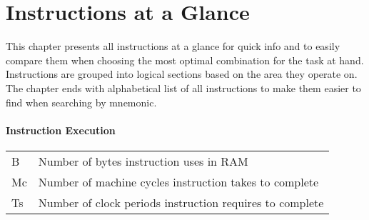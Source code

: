 \chapter{Instructions at a Glance}



\ChapterTOC[]

\pagebreak
\thispagestyle{plain} %

This chapter presents all instructions at a glance for quick info and to easily compare them when choosing the most optimal combination for the task at hand. Instructions are grouped into logical sections based on the area they operate on.
\ifdefined\PRINTED The chapter ends with alphabetical list of all instructions to make them easier to find when searching by mnemonic. \fi

\subsubsection{Instruction Execution}

\begin{tabular}{ll}
	B & Number of bytes instruction uses in RAM\\
	Mc\notet & Number of machine cycles instruction takes to complete\\
	Ts\notet & Number of clock periods instruction requires to complete\\
\end{tabular}

